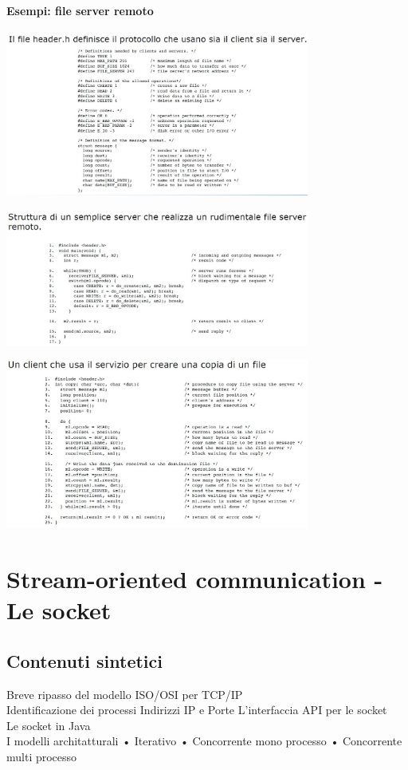 \subsubsection{Esempi: file server remoto}
\begin{center}
    \includegraphics[width=0.75\textwidth]{img/es_serverRemoto1.jpg}
\end{center}
\begin{center}
    \includegraphics[width=0.75\textwidth]{img/es_serverRemoto2.jpg}
\end{center}
\begin{center}
    \includegraphics[width=0.75\textwidth]{img/es_serverRemoto3.jpg}
\end{center}

\chapter{Stream-oriented communication - Le socket}
\section{Contenuti sintetici}
Breve ripasso del modello ISO/OSI per TCP/IP
\\Identificazione dei processi
Indirizzi IP e Porte
L'interfaccia API per le socket
\\Le socket in Java
\\I modelli architatturali
• Iterativo
• Concorrente mono processo
• Concorrente multi processo

